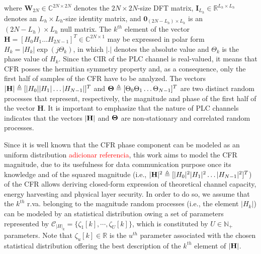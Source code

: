 \documentclass[journal]{IEEEtran}
\begin{document}
where $\mathbf{W}_{2N} \in \mathbb{C}^{2N\times 2N}$ denotes the $2N \times 2N$-size \ac{DFT} matrix, $ \mathbf{I}_{L_h} \in \mathbb{R}^{L_h\times L_h}$ denotes an $L_h\times L_h$-size identity matrix, and $ \mathbf{0}_{(2N-L_{h})\times L_{h}} $ is an $ (2N-L_{h})\times L_{h}$ null matrix. The $k^{th}$ element of the vector $\mathbf{H}=[H_0 H_1 \ldots H_{2N-1}]^T \in \mathbb{C}^{2N\times 1}$ may be expressed in polar form $H_k=|H_k|\exp(j \Theta_k)$, in which $|.|$ denotes the absolute value and $\Theta_k$ is the phase value of $H_k$. Since the \ac{CIR} of the \ac{PLC} channel is real-valued, it means that \ac{CFR} posses the hermitian symmetry property and, as a consequence, only the first half of samples of the \ac{CFR} have to be analyzed. The vectors $|{\bf H}|\triangleq [|H_0||H_1|\ldots |H_{N-1}|]^T$ and ${\bf \Theta}\triangleq[\Theta_0\Theta_1\ldots \Theta_{N-1}]^T$ are two distinct random processes that represent, respectively, the magnitude and phase of the first half of the vector $\mathbf{H}$. It is important to emphasize that the nature of \ac{PLC} channels indicates that the vectors $|{\bf H}|$ and ${\bf \Theta}$ are non-stationary and correlated random processes. 

Since it is well known that the \ac{CFR} phase component can be modeled as an uniform distribution \textcolor{red}{adicionar referencia}, this work aims to model the \ac{CFR} magnitude, due to its usefulness for data communication purpose once its knowledge and of the squared magnitude (i.e.,  $|{\bf H}|^2\triangleq[|H_0|^2|H_1|^2\ldots |H_{N-1}|^2]^T$) of the \ac{CFR} allows deriving closed-form expression of theoretical channel capacity, energy harvesting and physical layer security. In order to do so, we assume that the $k^{th}$ \ac{r.va.} belonging to the magnitude random processes (i.e., the element $|H_k|$) can be modeled by an statistical distribution owing a set of parameters represented by $\mathcal{C}_{|H|_k} = \{ \zeta_{1}[k], \cdots, \zeta_{U}[k] \}$, which is constituted by $U \in \mathbb{N}_+$ parameters. Note that $\zeta_{u}[k] \in \mathbb{R}$ is the $u^{th}$ parameter associated with the chosen statistical distribution offering the best description of the $k^{th}$ element of $|{\bf H}|$.
\end{document}
